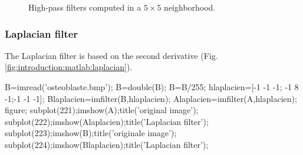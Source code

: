 \begin{figure}[htbp]
 \hspace{1cm}

 \caption{High-pass filters computed in a $5\times 5$ neighborhood.}
 \label{fig:introduction:matlab:hpfilters}
\end{figure}

\subsubsection{Laplacian filter}
The Laplacian filter is based on the second derivative (Fig.\ref{fig:introduction:matlab:laplacian}).
\begin{matlab}
B=imread('osteoblaste.bmp');
B=double(B);
B=B/255;
hlaplacien=[-1 -1 -1; -1 8 -1;-1 -1 -1];
Blaplacien=imfilter(B,hlaplacien);
Alaplacien=imfilter(A,hlaplacien);
figure;
subplot(221);imshow(A);title('original image');
subplot(222);imshow(Alaplacien);title('Laplacian filter');
subplot(223);imshow(B);title('originale image');
subplot(224);imshow(Blaplacien);title('Laplacian filter');
\end{matlab}

